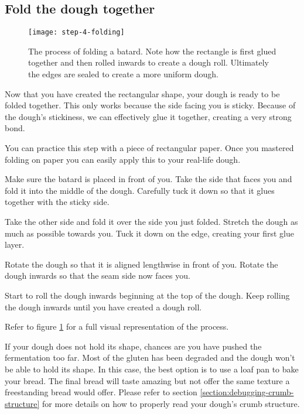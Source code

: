 \subsection[Folding]{Fold the dough together}

\begin{figure}[htb!]
  \texttt{[image: step-4-folding]}
  \caption{The process of folding a batard. Note how the rectangle is first glued
  together and then rolled inwards to create a dough roll. Ultimately the edges
  are sealed to create a more uniform dough.}
  \label{fig:shaping-folding}
\end{figure}

Now that you have created the rectangular shape, your dough
is ready to be folded together. This only works because the side
facing you is sticky. Because of the dough's stickiness,
we can effectively glue it together, creating a very
strong bond.

You can practice this step with a piece of rectangular paper.
Once you mastered folding on paper you can easily apply
this to your real-life dough.

Make sure the batard is placed in front of you. Take the side
that faces you and fold it into the middle of the dough. Carefully
tuck it down so that it glues together with the sticky side.

Take the other side and fold it over the side you just folded.
Stretch the dough as much as possible towards you. Tuck it down
on the edge, creating your first glue layer.

Rotate the dough so that it is aligned lengthwise in front of you.
Rotate the dough inwards so that the seam side
now faces you.

Start to roll the dough inwards beginning at the top of the dough.
Keep rolling the dough inwards until you have created a dough roll.

Refer to figure \ref{fig:shaping-folding} for a full visual
representation of the process.

If your dough does not hold its shape, chances are you have pushed
the fermentation too far. Most of the gluten has been degraded
and the dough won't be able to hold its shape. In this case,
the best option is to use a loaf pan to bake your bread. The
final bread will taste amazing but not offer the same texture
a freestanding bread would offer. Please refer to
section \ref{section:debugging-crumb-structure} for more
details on how to properly read your dough's crumb structure.

